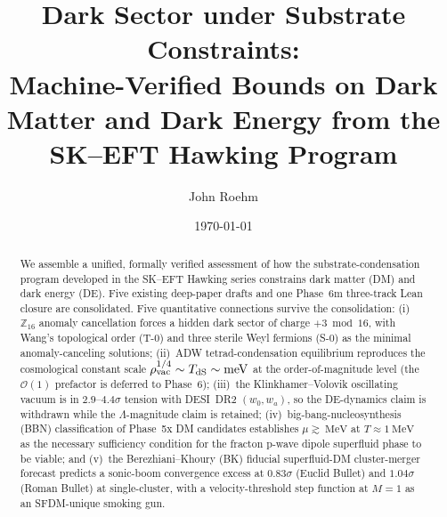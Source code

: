 \documentclass[aps,prd,reprint,nofootinbib,superscriptaddress]{revtex4-2}
\begin{document}
\title{Dark Sector under Substrate Constraints:\\
Machine-Verified Bounds on Dark Matter and Dark Energy from the
SK--EFT Hawking Program}

\author{John Roehm}

\date{\today}

\begin{abstract}
We assemble a unified, formally verified assessment of how the
substrate-condensation program developed in the SK--EFT Hawking series
constrains dark matter (DM) and dark energy (DE). Five existing
deep-paper drafts and one Phase~6m three-track Lean closure are
consolidated. Five quantitative connections survive the consolidation:
(i)~$\mathbb{Z}_{16}$ anomaly cancellation forces a hidden dark sector of
charge $+3 \bmod 16$, with Wang's topological order (T-0) and three
sterile Weyl fermions (S-0) as the minimal anomaly-canceling solutions;
(ii)~ADW tetrad-condensation equilibrium reproduces the cosmological
constant scale $\rho_{\rm vac}^{1/4} \sim T_{\rm dS} \sim
\SI{}{\milli\electronvolt}$ at the order-of-magnitude level (the
$\mathcal{O}(1)$ prefactor is deferred to Phase~6); (iii)~the
Klinkhamer--Volovik oscillating vacuum is in $2.9$--$4.4\sigma$ tension
with DESI~DR2 $(w_0, w_a)$, so the DE-dynamics claim is withdrawn while
the $\Lambda$-magnitude claim is retained; (iv)~big-bang-nucleosynthesis
(BBN) classification of Phase~5x DM candidates establishes
$\mu \gtrsim \SI{}{\mega\electronvolt}$ at $T \approx \SI{1}{\mega\electronvolt}$
as the necessary sufficiency condition for the fracton p-wave dipole
superfluid phase to be viable; and (v)~the Berezhiani--Khoury (BK)
fiducial superfluid-DM cluster-merger forecast predicts a
sonic-boom convergence excess at $0.83\sigma$ (Euclid Bullet) and
$1.04\sigma$ (Roman Bullet) at single-cluster, with a velocity-threshold
step function at $M{=}1$ as an SFDM-unique smoking gun.


\end{abstract}
\end{document}
